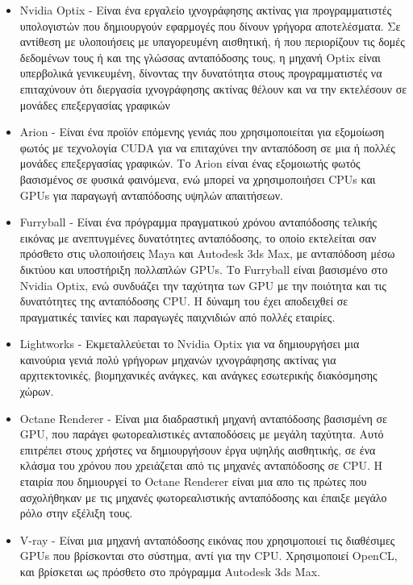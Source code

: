 \begin{itemize}
\item Nvidia Optix - Είναι ένα εργαλείο ιχνογράφησης ακτίνας για προγραμματιστές υπολογιστών που δημιουργούν εφαρμογές που δίνουν γρήγορα αποτελέσματα. Σε αντίθεση με υλοποιήσεις με υπαγορευμένη αισθητική, ή που περιορίζουν τις δομές δεδομένων τους ή και της γλώσσας ανταπόδοσης τους, η μηχανή Optix είναι υπερβολικά γενικευμένη, δίνοντας την δυνατότητα στους προγραμματιστές να επιταχύνουν ότι διεργασία ιχνογράφησης ακτίνας θέλουν και να την εκτελέσουν σε μονάδες επεξεργασίας γραφικών
\item Arion -  Eίναι ένα προϊόν επόμενης γενιάς που χρησιμοποιείται για εξομοίωση φωτός με τεχνολογία CUDA για να επιταχύνει την ανταπόδοση σε μια ή πολλές μονάδες επεξεργασίας γραφικών. Το Arion είναι ένας εξομοιωτής φωτός βασισμένος σε φυσικά φαινόμενα, ενώ μπορεί να χρησιμοποιήσει CPUs και GPUs για παραγωγή ανταπόδοσης υψηλών απαιτήσεων.
\item Furryball - Είναι ένα πρόγραμμα πραγματικού χρόνου ανταπόδοσης τελικής εικόνας με ανεπτυγμένες δυνατότητες ανταπόδοσης, το οποίο εκτελείται σαν πρόσθετο στις υλοποιήσεις Maya και Autodesk 3ds Max, με ανταπόδοση μέσω δικτύου και υποστήριξη πολλαπλών GPUs. Το Furryball είναι βασισμένο στο Nvidia Optix, ενώ συνδυάζει την ταχύτητα των GPU με την ποιότητα και τις δυνατότητες της ανταπόδοσης CPU. Η δύναμη του έχει αποδειχθεί σε πραγματικές ταινίες και παραγωγές παιχνιδιών από πολλές εταιρίες.
\item Lightworks - Εκμεταλλεύεται το Nvidia Optix για να δημιουργήσει μια καινούρια γενιά πολύ γρήγορων μηχανών ιχνογράφησης ακτίνας για αρχιτεκτονικές, βιομηχανικές ανάγκες, και ανάγκες εσωτερικής διακόσμησης χώρων.
\item Octane Renderer - Είναι μια διαδραστική μηχανή ανταπόδοσης βασισμένη σε GPU, που παράγει φωτορεαλιστικές ανταποδόσεις με μεγάλη ταχύτητα. Αυτό επιτρέπει στους χρήστες να δημιουργήσουν έργα υψηλής αισθητικής, σε ένα κλάσμα του χρόνου που χρειάζεται από τις μηχανές ανταπόδοσης σε CPU. Η εταιρία που δημιουργεί το Octane Renderer είναι μια απο τις πρώτες που ασχολήθηκαν με τις μηχανές φωτορεαλιστικής ανταπόδοσης και έπαιξε μεγάλο ρόλο στην εξέλιξη τους.
\item V-ray - Είναι μια μηχανή ανταπόδοσης εικόνας που χρησιμοποιεί τις διαθέσιμες GPUs που βρίσκονται στο σύστημα, αντί για την CPU. Χρησιμοποιεί OpenCL, και βρίσκεται ως πρόσθετο στο πρόγραμμα Autodesk 3ds Max.
\end{itemize}



